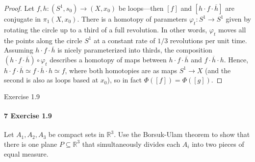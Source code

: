 \documentclass[12pt]{article}
\newlength{\myparskip}
\newenvironment{fullbox}{\begin{lrbox}{\savefullbox}\begin{minipage}{\dimexpr\textwidth-2\fboxsep\relax}\setlength{\parskip}{\myparskip}}{\end{minipage}\end{lrbox}\framebox[\textwidth]{\usebox{\savefullbox}}}
\newenvironment{pbox}[1][]{\begin{fullbox}\ifx#1\empty\else\paragraph{#1}\phantom{}\fi}{\end{fullbox}}
\theoremstyle{definition}
\newcommand{\R}{\mathbb{R}}
\renewcommand{\phi}{\varphi}
\newcommand{\<}{\langle}
\renewcommand{\>}{\rangle}
\newcommand{\seq}{\subseteq}
\newcommand{\htpy}{\simeq}
\begin{document}
\begin{proof}
    Let $f, h : (S^1, s_0) \to (X, x_0)$ be loops---then $[f]$ and $[h \cdot f \cdot \overline{h}]$ are conjugate in $\pi_1(X, x_0)$.
    There is a homotopy of parameters $\phi_t : S^1 \to S^1$ given by rotating the circle up to a third of a full revolution.
    In other words, $\phi_t$ moves all the points along the circle $S^1$ at a constant rate of $1/3$ revolutions per unit time.
    Assuming $h \cdot f \cdot \overline{h}$ is nicely parameterized into thirds, the composition $(h \cdot f \cdot \overline{h}) \circ \phi_t$ describes a homotopy of maps between $h \cdot f \cdot \overline{h}$ and $f \cdot \overline{h} \cdot h$.
    Hence, $h \cdot f \cdot \overline{h} \htpy f \cdot \overline{h} \cdot h \htpy f$, where both homotopies are as maps $S^1 \to X$ (and the second is also as loops based at $x_0$), so in fact $\Phi([f]) = \Phi([g])$.
\end{proof}

\begin{pbox}[7 Exercise 1.9]
    Let $A_1, A_2, A_3$ be compact sets in $\R^3$.
    Use the Borsuk-Ulam theorem to show that there is one plane $P \seq \R^3$ that simultaneously divides each $A_i$ into two pieces of equal measure.
\end{pbox}
\end{document}
